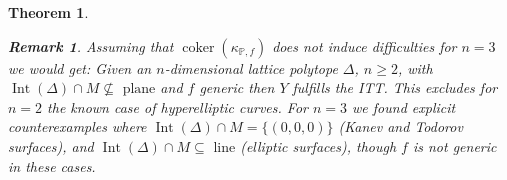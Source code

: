 \documentclass[12pt, english]{article}
\newtheorem{remark}[definition]{Remark}
\newtheorem{theorem}[definition]{Theorem}
\DeclareMathOperator{\coker}{coker}
\DeclareMathOperator{\Int}{Int}
\begin{document}
\begin{theorem}
	\begin{remark}
		\normalfont
		Assuming that $\coker(\kappa_{\mathbb{P},f})$ does not induce difficulties for $n=3$ we would get: Given an $n$-dimensional lattice polytope $\Delta$, $n \geq 2$, with $\Int(\Delta) \cap M \nsubseteq \textrm{ plane}$ and $f$ generic then $Y$ fulfills the ITT. This excludes for $n=2$ the known case of hyperelliptic curves. For $n=3$ we found explicit counterexamples where $\Int(\Delta)\cap M = \{(0,0,0)\}$ (Kanev and Todorov surfaces), and $\Int(\Delta) \cap M \subseteq \textrm{ line}$ (elliptic surfaces), though $f$ is not generic in these cases. 
	\end{remark}
	
\end{theorem}
\end{document}
